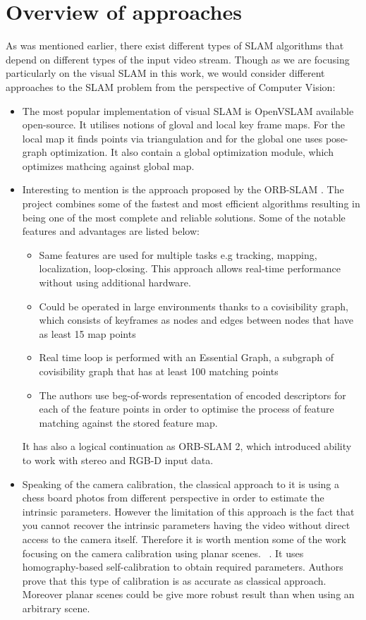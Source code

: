 \section{Overview of approaches}
As was mentioned earlier, there exist different types of SLAM algorithms that depend on different types of the input video stream. Though as we are focusing particularly on the visual SLAM in this work, we would consider different approaches to the SLAM problem from the perspective of Computer Vision:

\begin{itemize}
    \item The most popular implementation of visual SLAM is OpenVSLAM available open-source. It utilises notions of gloval and local key frame maps. For the local map it finds points via triangulation and for the global one uses pose-graph optimization. It also contain a global optimization module, which optimizes mathcing against global map. ~\cite{OpenVSLAM}
    \item Interesting to mention is the approach proposed by the ORB-SLAM \cite{ORB_SLAM}.
    The project combines some of the fastest and most efficient algorithms resulting in being one of the most complete and reliable solutions. Some of the notable features and advantages are listed below:
    \begin{itemize}
        \item Same features are used for multiple tasks e.g tracking, mapping, localization, loop-closing. This approach allows real-time performance without using additional hardware.
        \item Could be operated in large environments thanks to a covisibility graph, which consists of keyframes as nodes and edges between nodes that have as least 15 map points 
        \item Real time loop is performed with an Essential Graph, a subgraph of covisibility graph that has at least 100 matching points
        \item The authors use beg-of-words representation of encoded descriptors for each of the feature points in order to optimise the process of feature matching against the stored feature map.
    \end{itemize} It has also a logical continuation as ORB-SLAM 2, which introduced ability to work with stereo and RGB-D input data. ~\cite{ORB_SLAM2}
    \item Speaking of the camera calibration, the classical approach to it is using a chess board photos from different perspective in order to estimate the intrinsic parameters. However the limitation of this approach is the fact that you cannot recover the intrinsic parameters having the video without direct access to the camera itself. Therefore it is worth mention some of the work focusing on the camera calibration using planar scenes. ~\cite{Self_Calibration}. It uses homography-based self-calibration to obtain required parameters. Authors prove that this type of calibration is as accurate as classical approach. Moreover planar scenes could be give  more robust result than when using an arbitrary scene.

\end{itemize}
